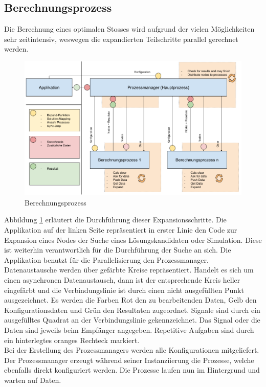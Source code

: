 \subsection{Berechnungsprozess}
Die Berechnung eines optimalen Stosses wird aufgrund der vielen Möglichkeiten sehr zeitintensiv, weswegen
die expandierten Teilschritte parallel gerechnet werden.

\begin{figure}[h!]
    \begin{center}
        \includegraphics[width=0.8\linewidth]{../common/03_billiard_ai/resources/14_berechnungsprozess.png}
    \end{center}
    \caption{Berechnungsprozess}
    \label{fig:berechnungsprozess}
\end{figure}

Abbildung \ref{fig:berechnungsprozess} erläutert die Durchführung dieser Expansionsschritte. Die Applikation auf der
linken Seite repräsentiert in erster Linie den Code zur Expansion eines Nodes der Suche eines Lösungskandidaten oder Simulation.
Diese ist weiterhin verantwortlich für die Durchführung der Suche an sich. Die Applikation benutzt für die Parallelisierung
den Prozessmanager. Datenaustausche werden über gefärbte Kreise repräsentiert. Handelt es sich um einen asynchronen
Datenaustausch, dann ist der entsprechende Kreis heller eingefärbt und die Verbindungslinie ist durch einen nicht
ausgefüllten Punkt ausgezeichnet. Es werden die Farben Rot den zu bearbeitenden Daten,
Gelb den Konfigurationsdaten und Grün den Resultaten zugeordnet. Signale sind durch ein ausgefülltes Quadrat an der
Verbindungslinie gekennzeichnet. Das Signal oder die Daten sind jeweils beim Empfänger angegeben. Repetitive Aufgaben
sind durch ein hinterlegtes oranges Rechteck markiert.
\\

Bei der Erstellung des Prozessmanagers werden alle Konfigurationen mitgeliefert. Der Prozessmanager erzeugt während seiner
Instanziierung die Prozesse, welche ebenfalls direkt konfiguriert werden. Die Prozesse laufen nun im Hintergrund und
warten auf Daten.\\

